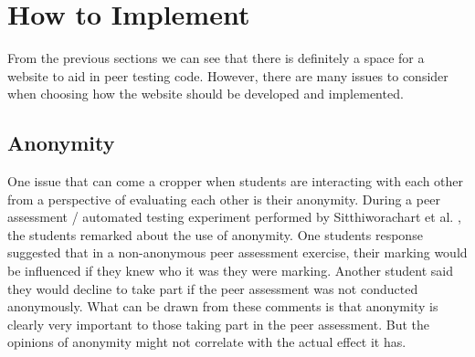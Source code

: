 \documentclass[a4paper,11pt]{report}
\begin{document}
\section{How to Implement}
From the previous sections we can see that there is definitely a space for a website to aid in peer testing code. However, there are many issues to consider when choosing how the website should be developed and implemented.

\subsection{Anonymity}
One issue that can come a cropper when students are interacting with each other from a perspective of evaluating each other is their anonymity. During a peer assessment / automated testing experiment performed by Sitthiworachart et al. \cite{sitthiworachart_effective_2004}, the students remarked about the use of anonymity. One students response suggested that in a non-anonymous peer assessment exercise, their marking would be influenced if they knew who it was they were marking. Another student said they would decline to take part if the peer assessment was not conducted anonymously. What can be drawn from these comments is that anonymity is clearly very important to those taking part in the peer assessment. But the opinions of anonymity might not correlate with the actual effect it has.\par
\end{document}
